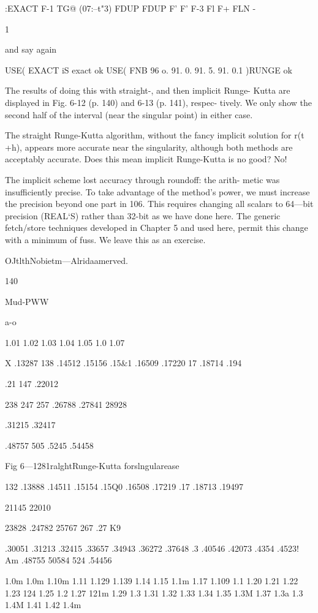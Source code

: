 {{:EXACT F-1 TG@ (07:--t"3)
FDUP FDUP F’ F' F-3 Fl F+ FLN -

1

and say again

USE( EXACT iS exact ok
USE( FNB 96 o. 91. 0. 91. 5. 91. 0.1 )RUNGE ok

The results of doing this with straight-, and then implicit Runge-
Kutta are displayed in Fig. 6-12 (p. 140) and 6-13 (p. 141), respec-
tively. We only show the second half of the interval (near the
singular point) in either case.

The straight Runge-Kutta algorithm, without the fancy implicit
solution for r(t +h), appears more accurate near the singularity,
although both methods are acceptably accurate. Does this mean
implicit Runge-Kutta is no good? No!

The implicit scheme lost accuracy through roundoff: the arith-
metic was insufficiently precise. To take advantage of the
method’s power, we must increase the precision beyond one part
in 106. This requires changing all scalars to 64—bit precision
(REAL‘S) rather than 32-bit as we have done here. The generic
fetch/store techniques developed in Chapter 5 and used here,
permit this change with a minimum of fuss. We leave this as an
exercise.

OJtlthNobietm—Alridaamerved.

140

Mud-PWW

a-o

1.01%
1.02%
1.03%
1.04%
1.05%
1.0%
1.07%

X
.13287
138%
.14512
.15156
.15&1
.16509
.17220
17%
.18714
.194%

.21 147
.22012

238%
247%
257%
.26788
.27841
28928

.31215
.32417

.48757
505%
.5245
.54458

Fig 6—1281ralghtRunge-Kutta forslngularease

132%
.13888
.14511
.15154
.15Q0
.16508
.17219
.17%
.18713
.19497

21145
22010

23828
.24782
25767
267%
.27 K9

.30051
.31213
.32415
.33657
.34943
.36272
.37648
.3%
.40546
.42073
.4354
.4523!
Am
.48755
50584
524%
.54456

 

1.0m
1.0m
1.10m
1.11%
1.129
1.139
1.14%
1.15%
1.1m
1.17%
1.109
1.1%
1.20%
1.21%
1.22%
1.23%
124%
1.25%
1.2%
1.27%
121m
1.29%
1.3%
1.31%
1.32%
1.33%
1.34%
1.35%
1.3M
1.37%
1.3a
1.3%
1.4M
1.41%
1.42%
1.4m

}}

